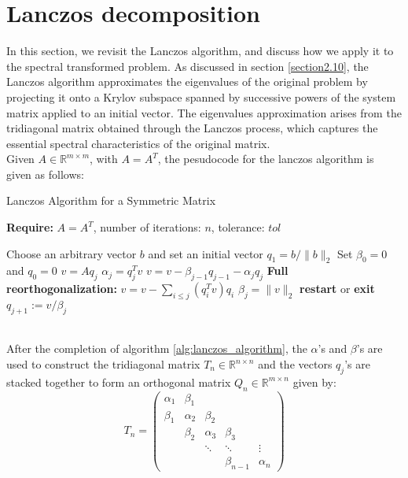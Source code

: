 \documentclass[12pt,gsu,online,openany,singleside,hidelinks]{gsudiss}
\newcommand{\comm}[1]{\added[comment={#1}]{}}
\begin{document}
\section{Lanczos decomposition}
In this section, we revisit the Lanczos algorithm, and discuss how we apply it to the spectral transformed problem. As discussed in section \ref{section2.10}, the Lanczos algorithm approximates the eigenvalues of the original problem by projecting it onto a Krylov subspace spanned by successive powers of the system matrix applied to an initial vector. The eigenvalues approximation arises from the tridiagonal matrix obtained through the Lanczos process, which captures the essential spectral characteristics of the original matrix.\\
Given $A \in \mathbb{R}^{m \times m}$, with $A=A^T$, the pesudocode for the lanczos algorithm is given as follows:
\begin{algorithm}
	\caption{Lanczos Algorithm for a Symmetric Matrix}
	\label{alg:lanczos_algorithm}

	\textbf{Require:} \( A = A^T \), number of iterations: \(n\), tolerance: \(tol\)
	\begin{algorithmic}[1]
		\State Choose an arbitrary vector $b$ and set an initial vector $q_1 = b/ \|b\|_2$ 
		\State Set $\beta_0 = 0$ and $q_0 = 0$
		\State $v = A q_j$
		\State $\alpha_j = q_j^T v $
		\State $v = v - \beta_{j-1}q_{j-1} - \alpha_j q_j$
		\State \textbf{Full reorthogonalization:} $v = v - \sum_{i \leq j} (q_i^T v) q_i$
		\State $\beta_{j} = \|v\|_2$
		\State \textbf{restart} or \textbf{exit}
		\EndIf
		\State $q_{j+1} := v / \beta_{j}$
		\EndFor
		\EndFunction
	\end{algorithmic}
\end{algorithm}\\
\comm{I believe you used $\alpha$ and $\beta$ for the generalized eigenvalue represented as a pair $(\alpha, \beta)$.  Under the circumstances, I think $\gamma$ and $\delta$ would be a better choice for Lanczos.  There are a lot of unbolded vectors in this section.}
After the completion of algorithm \ref{alg:lanczos_algorithm}, the $\alpha$'s and $\beta$'s are used to construct the tridiagonal matrix $T_n \in \mathbb{R}^{n \times n}$ and the vectors $q_j$'s are stacked together to form an orthogonal matrix $Q_n \in \mathbb{R}^{m \times n}$ given by:
\[T_n = \begin{pmatrix}
			\alpha_1 & \beta_1 & & & \\\beta_1 & \alpha_2 & \beta_2 & & \\ & \beta_2 & \alpha_3 & \beta_3 & \\ & & \ddots & \ddots & \vdots \\ & & & \beta_{n-1} & \alpha_n
		\end{pmatrix}\] 
\end{document}
